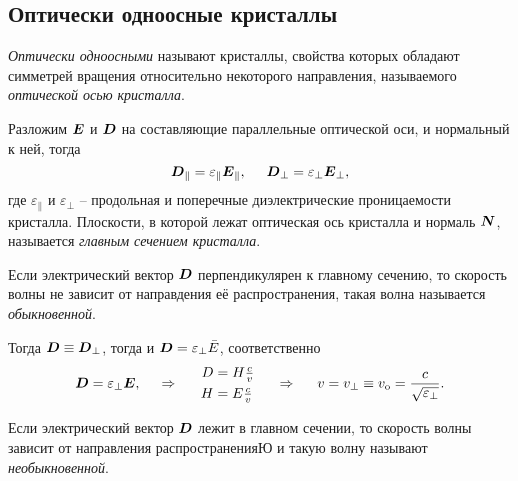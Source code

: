 \subsection{Оптически одноосные кристаллы}

\begin{to_def}
    \textit{Оптически одноосными} называют кристаллы, свойства которых обладают симметрей вращения относительно некоторого направления, называемого \textit{оптической осью кристалла}.
\end{to_def}

Разложим $\mbox{\boldmath $E$}$ и $\mbox{\boldmath $D$}$ на составляющие параллельные оптической оси, и нормальный к ней, тогда
\begin{equation*}
    \mbox{\boldmath $D$}_\parallel = \varepsilon_\parallel \mbox{\boldmath $E$}_\parallel,
    \hspace{5 mm} 
    \mbox{\boldmath $D$}_\bot = \varepsilon_\bot \mbox{\boldmath $E$}_\bot,
\end{equation*}
где $\varepsilon_\parallel$ и $\varepsilon_\bot$ -- продольная и поперечные диэлектрические проницаемости кристалла. Плоскости, в которой лежат оптическая ось кристалла и нормаль $\mbox{\boldmath $N$}$, называется \textit{главным сечением кристалла}. 


\begin{to_def}
    Если электрический вектор $\mbox{\boldmath $D$}$ перпендикулярен к главному сечению, то скорость волны не зависит от направдения её распространения, такая волна называется \textit{обыкновенной}.
\end{to_def}

Тогда $\mbox{\boldmath $D$} \equiv \mbox{\boldmath $D$}_\bot$, тогда и $\mbox{\boldmath $D$} = \varepsilon_\bot \bar{E}$, соответственно 
\begin{equation*}
    \mbox{\boldmath $D$} = \varepsilon_\bot \mbox{\boldmath $E$},
    \hspace{0.5cm} \Rightarrow \hspace{0.5cm}
    \left.\begin{aligned}
        D &= H \textstyle \frac{c}{v} \\
        H &= E \textstyle \frac{c}{v}
    \end{aligned}\right.
    \hspace{5 mm} \Rightarrow \hspace{5 mm} 
    v = v_\bot \equiv v_{\textnormal{o}} = \frac{c}{\sqrt{\varepsilon_\bot}}.
\end{equation*}

\begin{to_def}
    Если электрический вектор $\mbox{\boldmath $D$}$ лежит в главном сечении, то скорость волны зависит от направления распространенияЮ и такую волну называют \textit{необыкновенной}.
\end{to_def}

